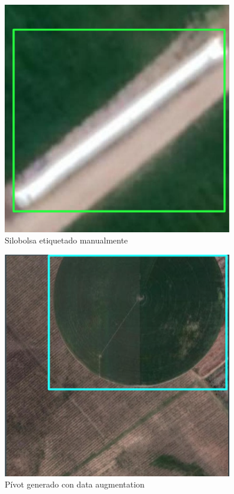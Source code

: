 \begin{figure}
    \centering
    \includegraphics[width=0.9\textwidth]{img/silobolsa etiquetado manual - 4.png}
    \caption{Silobolsa etiquetado manualmente}
    \label{Silobolsa etiquetado manualmento 4}
\end{figure}

\begin{figure}
    \centering
    \includegraphics[width=0.9\textwidth]{img/pivot data aug - 1.png}
    \caption{Pívot generado con data augmentation}
    \label{Pivot generado con data augmentation 1}
\end{figure}


